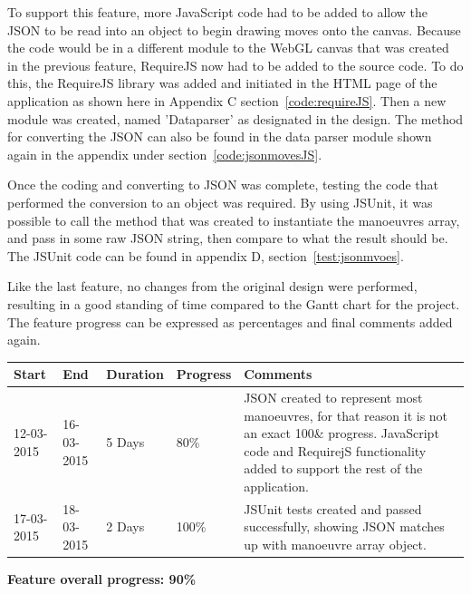To support this feature, more JavaScript code had to be added to allow the JSON to be read into an object to begin drawing moves onto the canvas. Because the code would be in a different module to the WebGL canvas that was created in the previous feature, RequireJS now had to be added to the source code. To do this, the RequireJS library was added and initiated in the HTML page of the application as shown here in Appendix C section~\ref{code:requireJS}. Then a new module was created, named 'Dataparser' as designated in the design. The method for converting the JSON can also be found in the data parser module shown again in the appendix under section~\ref{code:jsonmovesJS}.

Once the coding and converting to JSON was complete, testing the code that performed the conversion to an object was required. By using JSUnit, it was possible to call the method that was created to instantiate the manoeuvres array, and pass in some raw JSON string, then compare to what the result should be. The JSUnit code can be found in appendix D, section~\ref{test:jsonmvoes}.

Like the last feature, no changes from the original design were performed, resulting in a good standing of time compared to the Gantt chart for the project. The feature progress can be expressed as percentages and final comments added again.

\begin{table}[h]
\begin{tabular}{|l|l|l|l|p{7cm}|}
\hline
\textbf{Start} & \textbf{End} & \textbf{Duration} & \textbf{Progress} & \textbf{Comments}                                                                                                     \\ \hline
12-03-2015     & 16-03-2015   & 5 Days            & 80\%             & JSON created to represent most manoeuvres, for that reason it is not an exact 100\& progress. JavaScript code and RequirejS functionality added to support the rest of the application. \\ \hline
17-03-2015     & 18-03-2015   & 2 Days            & 100\%             & JSUnit tests created and passed successfully, showing JSON matches up with manoeuvre array object.\\ \hline
\end{tabular}
\end{table}

\textbf{Feature overall progress: 90\%}


